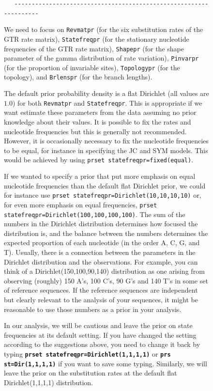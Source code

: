 \documentclass[12pt]{book}
\newcommand{\ttt}[1]{\texttt{#1}}
\newcommand{\tb}[1]{\ttt{\textbf{#1}}}
\begin{document}
\begin{figure}[h]
\begin{singlespacing}
\begin{verbatim}
   ------------------------------------------------------------------
\end{verbatim}
\normalsize
\end{singlespacing}

We need to focus on \ttt{Revmatpr} (for the six substitution rates of the GTR rate matrix),
\ttt{Statefreqpr} (for the stationary nucleotide frequencies of the GTR rate matrix), \ttt{Shapepr}
(for the shape parameter of the gamma distribution of rate variation), \ttt{Pinvarpr} (for the
proportion of invariable sites), \ttt{Topologypr} (for the topology), and \ttt{Brlenspr} (for the
branch lengths).

The default prior probability density is a flat Dirichlet (all values are $1.0$) for both
\ttt{Revmatpr} and \ttt{Statefreqpr}. This is appropriate if we want estimate these parameters from
the data assuming no prior knowledge about their values. It is possible to fix the rates and
nucleotide frequencies but this is generally not recommended. However, it is occasionally necessary
to fix the nucleotide frequencies to be equal, for instance in specifying the JC and SYM models.
This would be achieved by using \ttt{prset statefreqpr=fixed(equal)}.

If we wanted to specify a prior that put more emphasis on equal nucleotide frequencies than the
default flat Dirichlet prior, we could for instance use \ttt{prset
statefreqpr=Dirichlet(10,10,10,10)} or, for even more emphasis on equal frequencies, \ttt{prset
statefreqpr=Dirichlet(100,100,100,100)}. The sum of the numbers in the Dirichlet distribution
determines how focused the distribution is, and the balance between the numbers determines the
expected proportion of each nucleotide (in the order A, C, G, and T). Usually, there is a
connection between the parameters in the Dirichlet distribution and the observations. For example,
you can think of a Dirichlet(150,100,90,140) distribution as one arising from observing (roughly)
150 A's, 100 C's, 90 G's and 140 T's in some set of reference sequences. If the reference sequences
are independent but clearly relevant to the analysis of your sequences, it might be reasonable to
use those numbers as a prior in your analysis.

In our analysis, we will be cautious and leave the prior on state frequencies at its default
setting. If you have changed the setting according to the suggestions above, you need to change it
back by typing \tb{prset statefreqpr=Dirichlet(1,1,1,1)} or \tb{prs st=Dir(1,1,1,1)} if you want to
save some typing. Similarly, we will leave the prior on the substitution rates at the default flat
Dirichlet(1,1,1,1) distribution.


\end{figure}
\end{document}
